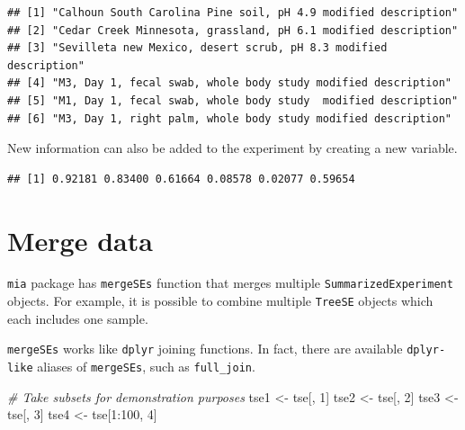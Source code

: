 \documentclass[
]{book}
\newenvironment{Shaded}{\begin{snugshade}}{\end{snugshade}}
\newcommand{\CommentTok}[1]{\textcolor[rgb]{0.56,0.35,0.01}{\textit{#1}}}
\newcommand{\DecValTok}[1]{\textcolor[rgb]{0.00,0.00,0.81}{#1}}
\newcommand{\FunctionTok}[1]{\textcolor[rgb]{0.00,0.00,0.00}{#1}}
\newcommand{\NormalTok}[1]{#1}
\newcommand{\OtherTok}[1]{\textcolor[rgb]{0.56,0.35,0.01}{#1}}
\newcommand{\SpecialCharTok}[1]{\textcolor[rgb]{0.00,0.00,0.00}{#1}}
\begin{document}
\begin{verbatim}
## [1] "Calhoun South Carolina Pine soil, pH 4.9 modified description"  
## [2] "Cedar Creek Minnesota, grassland, pH 6.1 modified description"  
## [3] "Sevilleta new Mexico, desert scrub, pH 8.3 modified description"
## [4] "M3, Day 1, fecal swab, whole body study modified description"   
## [5] "M1, Day 1, fecal swab, whole body study  modified description"  
## [6] "M3, Day 1, right palm, whole body study modified description"
\end{verbatim}

New information can also be added to the experiment by creating a new variable.

\begin{Shaded}
\end{Shaded}

\begin{verbatim}
## [1] 0.92181 0.83400 0.61664 0.08578 0.02077 0.59654
\end{verbatim}

\hypertarget{merge-data}{%
\section{Merge data}\label{merge-data}}

\texttt{mia} package has \texttt{mergeSEs} function that merges multiple \texttt{SummarizedExperiment}
objects. For example, it is possible to combine multiple \texttt{TreeSE} objects which each
includes one sample.

\texttt{mergeSEs} works like \texttt{dplyr} joining functions. In fact, there are available
\texttt{dplyr-like} aliases of \texttt{mergeSEs}, such as \texttt{full\_join}.

\begin{Shaded}
\begin{Highlighting}[]
\CommentTok{\# Take subsets for demonstration purposes}
\NormalTok{tse1 }\OtherTok{\textless{}{-}}\NormalTok{ tse[, }\DecValTok{1}\NormalTok{]}
\NormalTok{tse2 }\OtherTok{\textless{}{-}}\NormalTok{ tse[, }\DecValTok{2}\NormalTok{]}
\NormalTok{tse3 }\OtherTok{\textless{}{-}}\NormalTok{ tse[, }\DecValTok{3}\NormalTok{]}
\NormalTok{tse4 }\OtherTok{\textless{}{-}}\NormalTok{ tse[}\DecValTok{1}\SpecialCharTok{:}\DecValTok{100}\NormalTok{, }\DecValTok{4}\NormalTok{]}
\end{Highlighting}
\end{Shaded}
\end{document}
